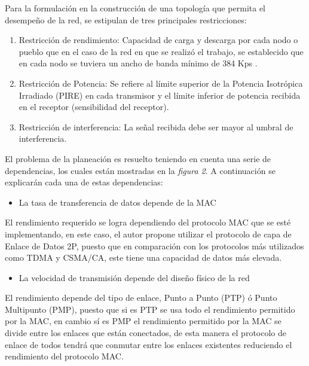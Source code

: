 \documentclass[]{article}
\providecommand{\tightlist}{%
  \setlength{\itemsep}{0pt}\setlength{\parskip}{0pt}}
\begin{document}
Para la formulación en la construcción de una topología que permita el
desempeño de la red, se estipulan de tres principales restricciones:

\begin{enumerate}
\def\labelenumi{\arabic{enumi}.}
\item
  Restricción de rendimiento: Capacidad de carga y descarga por cada
  nodo o pueblo que en el caso de la red en que se realizó el trabajo,
  se establecido que en cada nodo se tuviera un ancho de banda mínimo de
  384 Kps .
\item
  Restricción de Potencia: Se refiere al límite superior de la Potencia
  Isotrópica Irradiado (PIRE) en cada transmisor y el límite inferior de
  potencia recibida en el receptor (sensibilidad del receptor).
\item
  Restricción de interferencia: La señal recibida debe ser mayor al
  umbral de interferencia.
\end{enumerate}

El problema de la planeación es resuelto teniendo en cuenta una serie de
dependencias, los cuales están mostradas en la \emph{figura 2}. A
continuación se explicarán cada una de estas dependencias:

\begin{itemize}
\tightlist
\item
  La tasa de transferencia de datos depende de la MAC
\end{itemize}

El rendimiento requerido se logra dependiendo del protocolo MAC que se
esté implementando, en este caso, el autor propone utilizar el protocolo
de capa de Enlace de Datos 2P, puesto que en comparación con los
protocolos más utilizados como TDMA y CSMA/CA, este tiene una capacidad
de datos más elevada.

\begin{itemize}
\tightlist
\item
  La velocidad de transmisión depende del diseño físico de la red
\end{itemize}

El rendimiento depende del tipo de enlace, Punto a Punto (PTP) ó Punto
Multipunto (PMP), puesto que si es PTP se usa todo el rendimiento
permitido por la MAC, en cambio sí es PMP el rendimiento permitido por
la MAC se divide entre los enlaces que están conectados, de esta manera
el protocolo de enlace de todos tendrá que conmutar entre los enlaces
existentes reduciendo el rendimiento del protocolo MAC.
\end{document}
